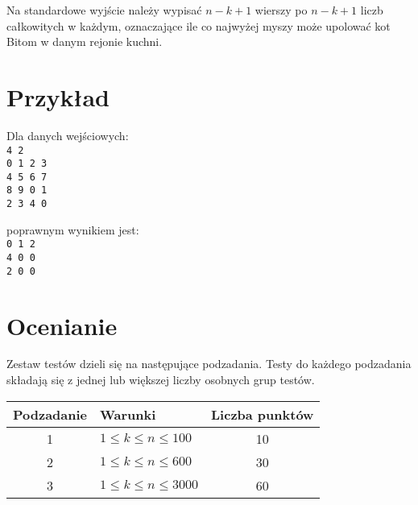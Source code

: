 \documentclass[10pt]{article}
\begin{document}
    Na standardowe wyjście należy wypisać $n-k+1$ wierszy po $n-k+1$ liczb całkowitych w każdym, oznaczające ile co najwyżej myszy może upolować kot Bitom w danym rejonie kuchni.


    \section*{Przykład}
    
    \noindent
    \begin{minipage}[t]{0.5\textwidth}
        Dla danych wejściowych:\vspace{1ex}\\
        \texttt{4 2\\0 1 2 3\\4 5 6 7\\8 9 0 1\\2 3 4 0}
    \end{minipage}
    \begin{minipage}[t]{0.5\textwidth}
        poprawnym wynikiem jest:\vspace{1ex}\\
        \texttt{0 1 2\\4 0 0\\2 0 0}
    \end{minipage}
    
    
    

    \section*{Ocenianie}
        
    Zestaw testów dzieli się na następujące podzadania. Testy do każdego podzadania składają się z jednej lub większej liczby osobnych grup testów.
    
    \begin{center}
        \begin{tabular}{ |c|p{9cm}|c| }
            \hline
            \textbf{Podzadanie} & \textbf{Warunki} & \textbf{Liczba punktów}\\
            \hline
            1 & $1 \leq k \leq n \leq 100$ & 10\\
            \hline
            2 & $1 \leq k \leq n \leq 600$ & 30\\
            \hline
            3 & $1 \leq k \leq n \leq 3000$ & 60\\
            \hline
        \end{tabular}
    \end{center}
\end{document}
